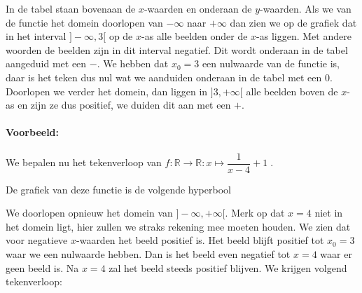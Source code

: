\documentclass[12pt,twoside]{article}
\begin{document}
\begin{theorie}
In de tabel staan bovenaan de $x$-waarden en onderaan de $y$-waarden. Als we van de functie het domein doorlopen van $-\infty$ naar $+\infty$ dan zien we op de grafiek dat in het interval $]-\infty,3[$ op de $x$-as alle beelden onder de $x$-as liggen. Met andere woorden de beelden zijn in dit interval negatief. Dit wordt onderaan in de tabel aangeduid met een $-$. We hebben dat $x_0=3$ een nulwaarde van de functie is, daar is het teken dus nul wat we aanduiden onderaan in de tabel met een $0$. Doorlopen we verder het domein, dan liggen in $]3,+\infty[$ alle beelden boven de $x$-as en zijn ze dus positief, we duiden dit aan met een $+$.

\pagebreak
\paragraph{Voorbeeld:} We bepalen nu het tekenverloop van $f:\mathbb{R}\to\mathbb{R}:x\mapsto \dfrac{1}{x-4}+1\;.$

De grafiek van deze functie is de volgende hyperbool
\begin{center}
\end{center}

We doorlopen opnieuw het domein van $]-\infty, +\infty[$. Merk op dat $x=4$ niet in het domein ligt, hier zullen we straks rekening mee moeten houden. We zien dat voor negatieve $x$-waarden het beeld positief is. Het beeld blijft positief tot $x_0=3$ waar we een nulwaarde hebben. Dan is het beeld even negatief tot $x=4$ waar er geen beeld is. Na $x=4$ zal het beeld steeds positief blijven. We krijgen volgend tekenverloop:


\end{theorie}
\end{document}
